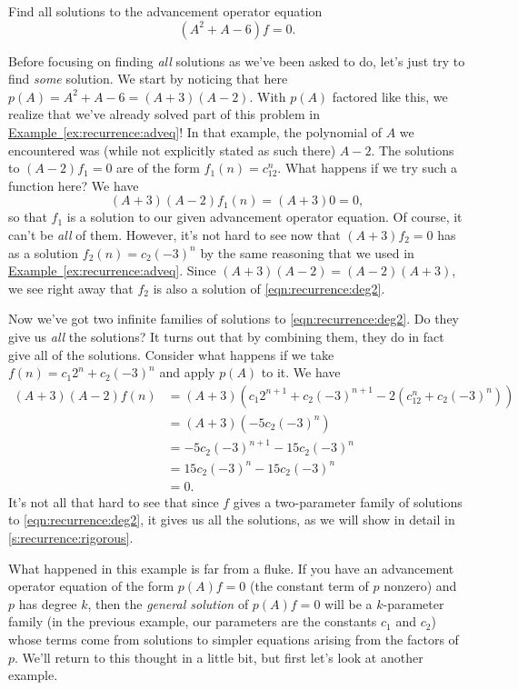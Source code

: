 \begin{example}\label{ex:recurrence:deg2}
  Find all solutions to the advancement operator equation
  \begin{equation}(A^2+A-6)f = 0.\label{eqn:recurrence:deg2}\end{equation}

  Before focusing on finding \emph{all} solutions as we've been asked
  to do, let's just try to find \emph{some} solution. We start by noticing
  that here $p(A) = A^2+A-6 = (A+3)(A-2)$. With $p(A)$ factored like
  this, we realize that we've already solved part of this problem in
  \hyperref[ex:recurrence:adveq]{Example~\ref*{ex:recurrence:adveq}}!
  In that example, the polynomial of $A$ we encountered was (while not
  explicitly stated as such there) $A-2$. The solutions to $(A-2)f_1=0$
  are of the form $f_1(n) = c_12^n$. What happens if we try such a
  function here? We have
  \[(A+3)(A-2)f_1(n) = (A+3)0 = 0,\]
  so that $f_1$ is a solution to our given advancement operator
  equation. Of course, it can't be \emph{all} of them. However, it's
  not hard to see now that $(A+3)f_2 = 0$ has as a solution $f_2(n) =
  c_2(-3)^n$ by the same reasoning that we used in
  \hyperref[ex:recurrence:adveq]{Example~\ref*{ex:recurrence:adveq}}. Since
  $(A+3)(A-2) = (A-2)(A+3)$, we see right away that $f_2$ is also a
  solution of \autoref{eqn:recurrence:deg2}.

  Now we've got two infinite families of solutions to
  \autoref{eqn:recurrence:deg2}. Do they give us \emph{all} the
  solutions? It turns out that by combining them, they do in fact give
  all of the solutions. Consider what happens if we take $f(n) = c_1
  2^n + c_2 (-3)^n$ and apply $p(A)$ to it. We have
  \begin{align*}
    (A+3)(A-2)f(n) & = (A+3)(c_1 2^{n+1} + c_2 (-3)^{n+1} - 2(c_12^n +
    c_2(-3)^n))\\
    & = (A+3)(-5c_2(-3)^{n})\\
    & = -5c_2(-3)^{n+1}-15c_2(-3)^n\\
    & = 15c_2(-3)^n - 15c_2(-3)^n\\
    &=0.
  \end{align*}
  It's not all that hard to see that since $f$ gives a two-parameter family of
  solutions to \autoref{eqn:recurrence:deg2}, it gives us all the
  solutions, as we will show in detail in \autoref{s:recurrence:rigorous}.
\end{example}

What happened in this example is far from a fluke. If you have an
advancement operator equation of the form $p(A)f=0$ (the constant term
of $p$ nonzero) and $p$ has degree $k$, then the \emph{general
  solution} of $p(A)f=0$ will be a $k$-parameter family (in the
previous example, our parameters are the constants $c_1$ and $c_2$)
whose terms come from solutions to simpler equations arising from the
factors of $p$. We'll return to this thought in a little bit, but
first let's look at another example.


